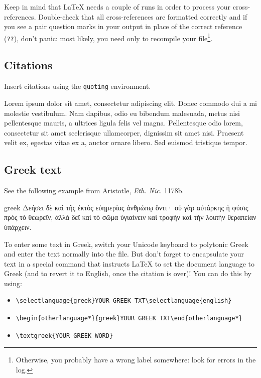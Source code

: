\documentclass[amsthm,ebook]{saparticle}
\begin{document}
Keep in mind that \LaTeX{} needs a couple of runs in order to process your cross-references. Double-check that all cross-references are formatted correctly and if you see a pair question marks in your output in place of the correct reference (\texttt{??}), don't panic: most likely, you need only to recompile your file\footnote{Otherwise, you probably have a wrong label somewhere: look for errors in the log.}.

\subsection{Citations}\label{sub:citations}

Insert citations using the \texttt{quoting} environment. 

\begin{quoting}
Lorem ipsum dolor sit amet, consectetur adipiscing elit. Donec commodo dui a mi molestie vestibulum. Nam dapibus, odio eu bibendum malesuada, metus nisi pellentesque mauris, a ultrices ligula felis vel magna. Pellentesque odio lorem, consectetur sit amet scelerisque ullamcorper, dignissim sit amet nisi. Praesent velit ex, egestas vitae ex a, auctor ornare libero. Sed euismod tristique tempor.
\end{quoting}

\subsection{Greek text}\label{sub:greek}

See the following example from Aristotle, \emph{Eth. Nic.} 1178b.
\begin{quoting}
\begin{otherlanguage*}{greek}
Δεήσει δὲ καὶ τῆς ἐκτὸς εὐημερίας ἀνθρώπῳ ὄντι· οὐ γὰρ αὐτάρκης ἡ φύσις πρὸς τὸ θεωρεῖν, ἀλλὰ δεῖ καὶ τὸ σῶμα ὑγιαίνειν καὶ τροφὴν καὶ τὴν λοιπὴν θεραπείαν ὑπάρχειν.
\end{otherlanguage*}
\end{quoting}

To enter some text in Greek, switch your Unicode keyboard to polytonic Greek and enter the text normally into the file. But don't forget to encapsulate your text in a special command that instructs \LaTeX{} to set the document language to Greek (and to revert it to English, once the citation is over)! You can do this by using:
\begin{itemize}
\item \begin{verbatim}\selectlanguage{greek}YOUR GREEK TXT\selectlanguage{english}\end{verbatim}
\item \begin{verbatim}\begin{otherlanguage*}{greek}YOUR GREEK TXT\end{otherlanguage*}\end{verbatim}
\item \begin{verbatim}\textgreek{YOUR GREEK WORD}\end{verbatim}
\end{itemize}
\end{document}
